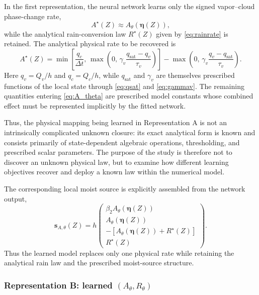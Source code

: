 \documentclass[12pt]{article}
\begin{document}
In the first representation, the neural network learns only the signed
vapor--cloud phase-change rate,
\begin{equation}
	A^\star(Z)
	\approx
	A_\theta\!\left(\boldsymbol{\eta}(Z)\right),
	\label{eq:repA_mapping}
\end{equation}
while the analytical rain-conversion law $R^\star(Z)$ given by
\eqref{eq:rainrate} is retained.
The analytical physical rate to be recovered is
\begin{equation}
	A^\star(Z)
	=
	\min\left[
	\frac{q_c}{\Delta t},
	\,
	\max\left(
	0,\,
	\gamma_v
	\frac{q_{\mathrm{sat}}-q_v}{\tau_v}
	\right)
	\right]
	-
	\max\left(
	0,\,
	\gamma_v
	\frac{q_v-q_{\mathrm{sat}}}{\tau_v}
	\right).
	\label{eq:A_theta}
\end{equation}
Here $q_v=Q_v/h$ and $q_c=Q_c/h$, while $q_{\mathrm{sat}}$ and
$\gamma_v$ are themselves prescribed functions of the local state through
\eqref{eq:qsat} and \eqref{eq:gammav}. The remaining quantities entering \eqref{eq:A_theta} are prescribed model
constants whose combined effect must be represented implicitly by the fitted
network.

Thus, the physical mapping being learned in Representation A is not an
intrinsically complicated unknown closure: its exact analytical form is
known and consists primarily of state-dependent algebraic operations,
thresholding, and prescribed scalar parameters. The purpose of the study is
therefore not to discover an unknown physical law, but to examine how
different learning objectives recover and deploy a known law within the
numerical model.

The corresponding local moist source is explicitly assembled from the
network output,
\begin{equation}
	\mathbf{s}_{A,\theta}(Z)
	=
	h
	\begin{pmatrix}
		\beta_2 A_\theta(\boldsymbol{\eta}(Z))\\
		A_\theta(\boldsymbol{\eta}(Z))\\
		-\left[A_\theta(\boldsymbol{\eta}(Z))+R^\star(Z)\right]\\
		R^\star(Z)
	\end{pmatrix}.
	\label{eq:representation_A}
\end{equation}
Thus the learned model replaces only one physical rate while retaining the
analytical rain law and the prescribed moist-source structure.

\subsubsection{Representation B: learned $(A_\theta,R_\theta)$}
\end{document}
